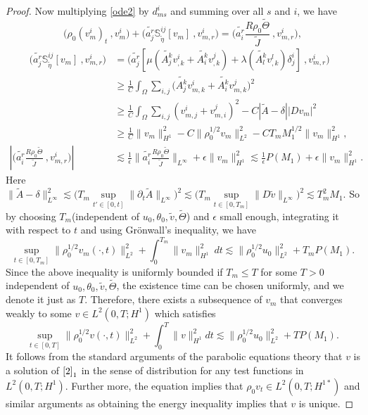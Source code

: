 \documentclass[12pt,a4paper]{amsart}
\numberwithin{equation}{section}
\theoremstyle{plain}
\theoremstyle{definition}
\begin{document}
\begin{proof}
	Now multiplying \eqref{ode2} by $d^i_{ms}$ and summing over all $s$ and $i$, we have
	\begin{equation*}
	\Big(\rho_0 (v^i_m)_t~, v^i_m \Big) 
    + \Big(\widetilde{a^r_j}\mathbb{S}^{ij}_{\widetilde{\eta}}[v_m]~, v^i_{m,r} \Big)
    =\Big(\widetilde{a^r_i} \frac{R\rho_0 \widetilde{\Theta}}{\widetilde{J}}~, v^i_{m,r} \Big),
	\end{equation*}
	\begin{align*}
	\qquad \Big(\widetilde{a^r_j}\mathbb{S}^{ij}_{\widetilde{\eta}}[v_m]~, v^i_{m,r} \Big)&=\Big(\widetilde{a^r_j}[\mu (\widetilde{A^{k}_j }v^i_{,k}+\widetilde{A^k_i} v^j_{,k})+\lambda (\widetilde{A_l^k} v^l_{,k} )\delta^i_j]~, v^i_{m,r} \Big)\\
	&\geq \frac{1}{C} \int_{\Omega} \sum\limits_{i,j}\Big(\widetilde{A^k_j} v^i_{m,k}+\widetilde{A^k_i}  v^j_{m,k}\Big)^2\\
	&\geq\frac{1}{C}\int_{\Omega}\sum\limits_{i,j}( v^i_{m,j}+v^j_{m,i})^2 
	-C|\widetilde{A}-\delta| |Dv_m|^2\\
	&\geq\frac{1}{C}\|v_m\|_{H^1}^2-C\|\rho_0^{1/2}v_m\|_{L^2}^2-CT_mM_1^{1/2} \|v_m\|_{H^1}^2,\\
	\left|\Big(\widetilde{a^r_i} \frac{R\rho_0 \widetilde{\Theta}}{\widetilde{J}}~, v^i_{m,r} \Big) \right|
	&\lesssim \frac{1}{\epsilon}\|\widetilde{a^r_i} \frac{R\rho_0 \widetilde{\Theta}}{\widetilde{J}}\|_{L^{\infty}}+\epsilon \|v_m\|_{H^1}^2
	\lesssim \frac{1}{\epsilon}P(M_1)+\epsilon \|v_m\|_{H^1}^2.
	\end{align*}
	Here $\| \widetilde{A}-\delta\|_{L^{\infty}}^2
	\lesssim  \Big(T_m\sup\limits_{t'\in[0,t]}\|\partial_t \widetilde{A}\|_{L^{\infty}}\Big)^2
	\lesssim \Big(T_m\sup\limits_{t\in[0,T_m]}\|D \widetilde{v}\|_{L^{\infty}}\Big)^2
	\lesssim T_m^2 M_1$.
	So by choosing $T_m$(independent of $u_0,\theta_0,\widetilde{v},\widetilde{\Theta}$) and $\epsilon$ small enough, %
	integrating it with respect to $t$ and using Gr\"{o}nwall's inequality, we have
	\begin{equation*}
	\sup\limits_{t\in[0,T_m]} \|\rho_0^{1/2} v_m(\cdot, t)\|_{L^2}^2 +\int_{0}^{T_m}\|v_m\|_{H^1}^2\ dt 
	\lesssim \|\rho_0^{1/2} u_0\|_{L^2}^2+T_mP(M_1).
	\end{equation*}
	Since the above inequality is uniformly bounded if $T_m\leq T$ for some $T>0$ independent of $u_0,\theta_0,\widetilde{v},\widetilde{\Theta}$, the existence time can be chosen uniformly, and we denote it just as $T$.
    Therefore, there exists a subsequence of $v_m$ that converges weakly to some $v\in L^2(0,T;H^1)$ which satisfies 
    \begin{equation*}
	\sup\limits_{t\in[0,T]} \|\rho_0^{1/2} v(\cdot, t)\|_{L^2}^2 +\int_{0}^{T}\|v\|_{H^1}^2 dt 
	\lesssim \|\rho_0^{1/2} u_0\|_{L^2}^2+TP(M_1).
	\end{equation*}
    It follows from the standard arguments of the parabolic equations theory that $v$ is a solution of $\eqref{2}_1$ in the sense of distribution for any test functions in $L^2(0,T;H^1)$.
    Further more,  the equation implies that $\rho_0v_t\in L^2(0,T;H^{1*})$ and similar arguments as obtaining the energy inequality implies that $v$ is unique.
    

\end{proof}
\end{document}
